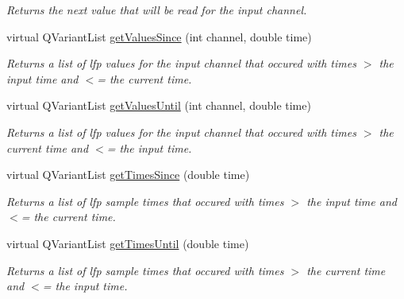 \begin{DoxyCompactItemize}
\begin{DoxyCompactList}\small\item\em Returns the next value that will be read for the input channel. \end{DoxyCompactList}\item 
\hypertarget{class_picto_1_1_lfp_state_adc00615a7a96217a74768eaa4ce929cc}{virtual Q\-Variant\-List \hyperlink{class_picto_1_1_lfp_state_adc00615a7a96217a74768eaa4ce929cc}{get\-Values\-Since} (int channel, double time)}\label{class_picto_1_1_lfp_state_adc00615a7a96217a74768eaa4ce929cc}

\begin{DoxyCompactList}\small\item\em Returns a list of lfp values for the input channel that occured with times $>$ the input time and $<$= the current time. \end{DoxyCompactList}\item 
\hypertarget{class_picto_1_1_lfp_state_a3f37b279a3fcc62ba348ed29000d24ed}{virtual Q\-Variant\-List \hyperlink{class_picto_1_1_lfp_state_a3f37b279a3fcc62ba348ed29000d24ed}{get\-Values\-Until} (int channel, double time)}\label{class_picto_1_1_lfp_state_a3f37b279a3fcc62ba348ed29000d24ed}

\begin{DoxyCompactList}\small\item\em Returns a list of lfp values for the input channel that occured with times $>$ the current time and $<$= the input time. \end{DoxyCompactList}\item 
\hypertarget{class_picto_1_1_lfp_state_a33fdf6ba719525e99ae8ebc3390257ce}{virtual Q\-Variant\-List \hyperlink{class_picto_1_1_lfp_state_a33fdf6ba719525e99ae8ebc3390257ce}{get\-Times\-Since} (double time)}\label{class_picto_1_1_lfp_state_a33fdf6ba719525e99ae8ebc3390257ce}

\begin{DoxyCompactList}\small\item\em Returns a list of lfp sample times that occured with times $>$ the input time and $<$= the current time. \end{DoxyCompactList}\item 
\hypertarget{class_picto_1_1_lfp_state_aca7c7c342ced94f37610fcaa23333d76}{virtual Q\-Variant\-List \hyperlink{class_picto_1_1_lfp_state_aca7c7c342ced94f37610fcaa23333d76}{get\-Times\-Until} (double time)}\label{class_picto_1_1_lfp_state_aca7c7c342ced94f37610fcaa23333d76}

\begin{DoxyCompactList}\small\item\em Returns a list of lfp sample times that occured with times $>$ the current time and $<$= the input time. \end{DoxyCompactList}\end{DoxyCompactItemize}



